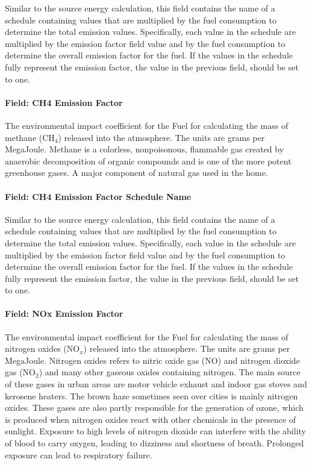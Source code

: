 Similar to the source energy calculation, this field contains the name of a schedule containing values that are multiplied by the fuel consumption to determine the total emission values. Specifically, each value in the schedule are multiplied by the emission factor field value and by the fuel consumption to determine the overall emission factor for the fuel. If the values in the schedule fully represent the emission factor, the value in the previous field, should be set to one.

\paragraph{Field: CH4 Emission Factor}\label{field-ch4-emission-factor}

The environmental impact coefficient for the Fuel for calculating the mass of methane (CH\(_{4}\)) released into the atmosphere. The units are grams per MegaJoule. Methane is a colorless, nonpoisonous, flammable gas created by anaerobic decomposition of organic compounds and is one of the more potent greenhouse gases. A major component of natural gas used in the home.

\paragraph{Field: CH4 Emission Factor Schedule Name}\label{field-ch4-emission-factor-schedule-name}

Similar to the source energy calculation, this field contains the name of a schedule containing values that are multiplied by the fuel consumption to determine the total emission values. Specifically, each value in the schedule are multiplied by the emission factor field value and by the fuel consumption to determine the overall emission factor for the fuel. If the values in the schedule fully represent the emission factor, the value in the previous field, should be set to one.

\paragraph{Field: NOx Emission Factor}\label{field-nox-emission-factor}

The environmental impact coefficient for the Fuel for calculating the mass of nitrogen oxides (NO\(_{x}\)) released into the atmosphere. The units are grams per MegaJoule. Nitrogen oxides refers to nitric oxide gas (NO) and nitrogen dioxide gas (NO\(_{2}\)) and many other gaseous oxides containing nitrogen. The main source of these gases in urban areas are motor vehicle exhaust and indoor gas stoves and kerosene heaters. The brown haze sometimes seen over cities is mainly nitrogen oxides. These gases are also partly responsible for the generation of ozone, which is produced when nitrogen oxides react with other chemicals in the presence of sunlight. Exposure to high levels of nitrogen dioxide can interfere with the ability of blood to carry oxygen, leading to dizziness and shortness of breath. Prolonged exposure can lead to respiratory failure.

